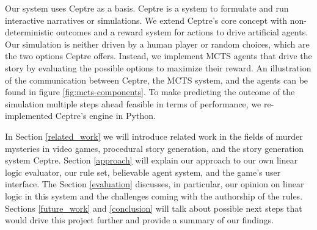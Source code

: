 Our system uses Ceptre \cite{martens_2015} as a basis. Ceptre is a system to formulate and run interactive narratives or simulations.
We extend Ceptre's core concept with non-deterministic outcomes and a reward system for actions to drive artificial agents.
Our simulation is neither driven by a human player or random choices, which are the two options Ceptre offers.
Instead, we implement MCTS agents that drive the story by evaluating the possible options to maximize their reward.
An illustration of the communication between Ceptre, the MCTS system, and the agents can be found in figure \ref{fig:mcts-components}.
To make predicting the outcome of the simulation multiple steps ahead feasible in terms of performance, we re-implemented Ceptre's engine in Python.

In Section \ref{related_work} we will introduce related work in the fields of murder mysteries in video games, procedural story generation, and the story generation system Ceptre.
Section \ref{approach} will explain our approach to our own linear logic evaluator, our rule set, believable agent system, and the game's user interface.
The Section \ref{evaluation} discusses, in particular, our opinion on linear logic in this system and the challenges coming with the authorship of the rules.
Sections \ref{future_work} and \ref{conclusion} will talk about possible next steps that would drive this project further and provide a summary of our findings.
